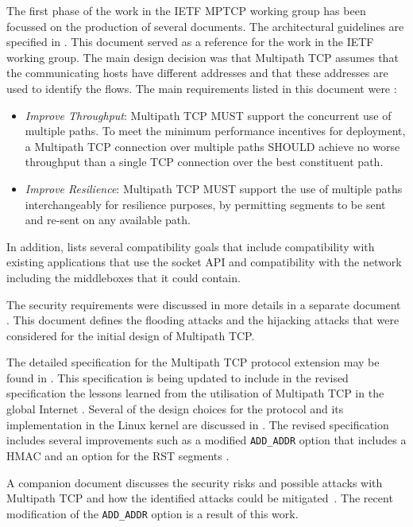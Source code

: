 
The first phase of the work in the IETF MPTCP working group has been focussed on the production of several documents. The architectural guidelines are specified in \cite{rfc6182}. This document served as a reference for the work in the IETF working group. The main design decision was that Multipath TCP assumes that the communicating hosts have different addresses and that these addresses are used to identify the flows. The main requirements listed in this document were :
\begin{itemize}

\item \emph{Improve Throughput}: Multipath TCP MUST support the concurrent use of multiple paths.  To meet the minimum performance incentives for deployment, a Multipath TCP connection over multiple paths SHOULD achieve no worse throughput than a single TCP connection over the best constituent path.
\item \emph{Improve Resilience}: Multipath TCP MUST support the use of multiple paths interchangeably for resilience purposes, by permitting segments to be sent and re-sent on any available path. 
\end{itemize}

In addition, \cite{rfc6182} lists several compatibility goals that include compatibility with existing applications that use the socket API and compatibility with the network including the middleboxes that it could contain.

The security requirements were discussed in more details in a separate document \cite{rfc6181}. This document defines the flooding attacks and the hijacking attacks that were considered for the initial design of Multipath TCP. 


The detailed specification for the Multipath TCP protocol extension may be found in \cite{rfc6824}. This specification is being updated to include in the revised specification the lessons learned from the utilisation of Multipath TCP in the global Internet \cite{draft-ietf-mptcp-experience}. Several of the design choices for the protocol and its implementation in the Linux kernel are discussed in \cite{Raiciu_Hard:2012}. The revised specification \cite{draft-ietf-mptcp-rfc6824bis} includes several improvements such as a modified \texttt{ADD\_ADDR} option that includes a HMAC and an option for the RST segments \cite{draft-bonaventure-mptcp-rst}.

A companion document discusses the security risks and possible attacks with Multipath TCP and how the identified attacks
could be mitigated~\cite{draft-ietf-mptcp-attacks}. The recent 
modification of the \texttt{ADD\_ADDR} option is a result of this work.



